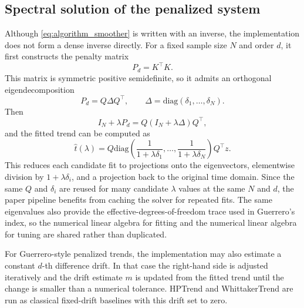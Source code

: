 \subsection{Spectral solution of the penalized system}
Although \eqref{eq:algorithm_smoother} is written with an inverse, the
implementation does not form a dense inverse directly. For a fixed sample size
\(N\) and order \(d\), it first constructs the penalty matrix
\[
  P_d = K^\top K.
\]
This matrix is symmetric positive semidefinite, so it admits an orthogonal
eigendecomposition
\[
  P_d = Q \Delta Q^\top,
  \qquad
  \Delta=\mathrm{diag}(\delta_1,\ldots,\delta_N).
\]
Then
\[
  I_N+\lambda P_d
  =
  Q(I_N+\lambda \Delta)Q^\top,
\]
and the fitted trend can be computed as
\begin{equation}
\label{eq:algorithm_spectral_solution}
  \hat{t}(\lambda)
  =
  Q
  \mathrm{diag}\left(
    \frac{1}{1+\lambda \delta_1},
    \ldots,
    \frac{1}{1+\lambda \delta_N}
  \right)
  Q^\top z.
\end{equation}
This reduces each candidate fit to projections onto the eigenvectors, elementwise
division by \(1+\lambda\delta_i\), and a projection back to the original time
domain. Since the same \(Q\) and \(\delta_i\) are reused for many candidate
\(\lambda\) values at the same \(N\) and \(d\), the paper pipeline benefits from
caching the solver for repeated fits. The same eigenvalues also provide the
effective-degrees-of-freedom trace used in Guerrero's index, so the numerical
linear algebra for fitting and the numerical linear algebra for tuning are
shared rather than duplicated.

For Guerrero-style penalized trends, the implementation may also estimate a
constant \(d\)-th difference drift. In that case the right-hand side is adjusted
iteratively and the drift estimate \(m\) is updated from the fitted trend until
the change is smaller than a numerical tolerance. HPTrend and WhittakerTrend are
run as classical fixed-drift baselines with this drift set to zero.


